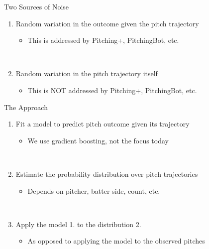 \documentclass{beamer}
\begin{document}
  \begin{frame}{Two Sources of Noise}
    \begin{enumerate}
      \item Random variation in the outcome given the pitch trajectory
      \begin{itemize}
        \item This is addressed by Pitching+, PitchingBot, etc.
      \end{itemize}
      ~\\
      \item Random variation in the pitch trajectory itself
      \begin{itemize}
        \item This is NOT addressed by Pitching+, PitchingBot, etc.
      \end{itemize}
    \end{enumerate}
  \end{frame}

  \begin{frame}{The Approach}
    \begin{enumerate}
      \item Fit a model to predict pitch outcome given its trajectory
      \begin{itemize}
        \item We use gradient boosting, not the focus today
      \end{itemize}
      ~\\
      \item Estimate the probability distribution over pitch trajectories
      \begin{itemize}
        \item Depends on pitcher, batter side, count, etc.
      \end{itemize}
      ~\\
      \item Apply the model {\color{riceblue} 1.} to the distribution {\color{riceblue} 2.}
      \begin{itemize}
        \item As opposed to applying the model to the observed pitches
      \end{itemize}
    \end{enumerate}
  \end{frame}
\end{document}
